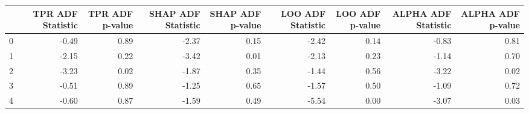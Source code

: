 \begin{tabular}{lrrrrrrrr}
\toprule
 & TPR ADF Statistic & TPR ADF p-value & SHAP ADF Statistic & SHAP ADF p-value & LOO ADF Statistic & LOO ADF p-value & ALPHA ADF Statistic & ALPHA ADF p-value \\
\midrule
0 & -0.49 & 0.89 & -2.37 & 0.15 & -2.42 & 0.14 & -0.83 & 0.81 \\
1 & -2.15 & 0.22 & -3.42 & 0.01 & -2.13 & 0.23 & -1.14 & 0.70 \\
2 & -3.23 & 0.02 & -1.87 & 0.35 & -1.44 & 0.56 & -3.22 & 0.02 \\
3 & -0.51 & 0.89 & -1.25 & 0.65 & -1.57 & 0.50 & -1.09 & 0.72 \\
4 & -0.60 & 0.87 & -1.59 & 0.49 & -5.54 & 0.00 & -3.07 & 0.03 \\
\bottomrule
\end{tabular}
